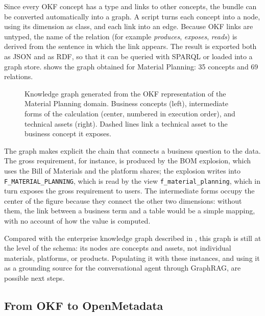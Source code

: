 Since every OKF concept has a type and links to other concepts, the bundle can be converted automatically into a graph. A script turns each concept into a node, using its dimension as class, and each link into an edge. Because OKF links are untyped, the name of the relation (for example \textit{produces}, \textit{exposes}, \textit{reads}) is derived from the sentence in which the link appears. The result is exported both as JSON and as RDF, so that it can be queried with SPARQL or loaded into a graph store.  shows the graph obtained for Material Planning: 35 concepts and 69 relations.

\begin{figure}[p]
    \centering
    \caption{Knowledge graph generated from the OKF representation of the Material Planning domain. Business concepts (left), intermediate forms of the calculation (center, numbered in execution order), and technical assets (right). Dashed lines link a technical asset to the business concept it exposes.}
    \label{fig:okf_kg}
\end{figure}

The graph makes explicit the chain that connects a business question to the data. The gross requirement, for instance, is produced by the BOM explosion, which uses the Bill of Materials and the platform shares; the explosion writes into \texttt{F\_MATERIAL\_PLANNING}, which is read by the view \texttt{f\_material\_planning}, which in turn exposes the gross requirement to users. The intermediate forms occupy the center of the figure because they connect the other two dimensions: without them, the link between a business term and a table would be a simple mapping, with no account of how the value is computed.

Compared with the enterprise knowledge graph described in , this graph is still at the level of the schema: its nodes are concepts and assets, not individual materials, platforms, or products. Populating it with these instances, and using it as a grounding source for the conversational agent through GraphRAG, are possible next steps.

\subsection{From OKF to OpenMetadata}
\label{subsec:okf_openmetadata}


